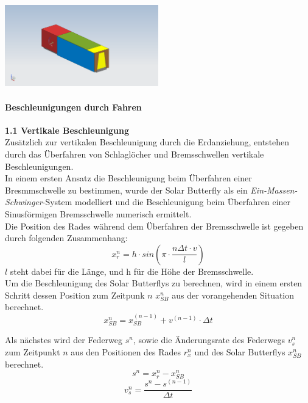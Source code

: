 \begin{center}
  \includegraphics[width=0.5\textwidth]{04_Figures/A.png}
  \label{Modus A}
\end{center}

  \paragraph{Beschleunigungen durch Fahren}
  \begin{description}
    \item \textbf{1.1 Vertikale Beschleunigung}\\
    Zusätzlich zur vertikalen Beschleunigung durch die Erdanziehung, entstehen durch das Überfahren von Schlaglöcher und Bremsschwellen vertikale Beschleunigungen.\\
    In einem ersten Ansatz die Beschleunigung beim Überfahren einer Bresmmschwelle zu bestimmen, wurde der Solar Butterfly als ein \emph{Ein-Massen-Schwinger}-System modelliert und die Beschleunigung beim Überfahren einer Sinusförmigen Bremsschwelle numerisch ermittelt.\\

    Die Position des Rades während dem Überfahren der Bremsschwelle ist gegeben durch folgenden Zusammenhang:
    \begin{equation}
      x_r^n = h \cdot sin\left(\pi \cdot \frac{n\Delta t \cdot v}{l}\right)
    \end{equation}
    $l$ steht dabei für die Länge, und h für die Höhe der Bremsschwelle.\\

    Um die Beschleunigung des Solar Butterflys zu berechnen, wird in einem ersten Schritt dessen Position zum Zeitpunk $n$ $x_{SB}^n$ aus der vorangehenden Situation berechnet.
    \begin{equation}
      x_{SB}^n = x_{SB}^{(n-1)} + v^{(n-1)} \cdot \Delta t
    \end{equation}

    Als nächstes wird der Federweg $s^n$, sowie die Änderungsrate des Federwegs $v_s^n$ zum Zeitpunkt $n$ aus den Positionen des Rades $r_x^n$ und des Solar Butterflys $x_{SB}^n$ berechnet.
    \begin{equation}
      s^n = x_r^n - x_{SB}^n
    \end{equation}
    \begin{equation}
      v_s^n = \frac{s^n - s^{(n-1)}}{\Delta t}
    \end{equation}


\end{description}
